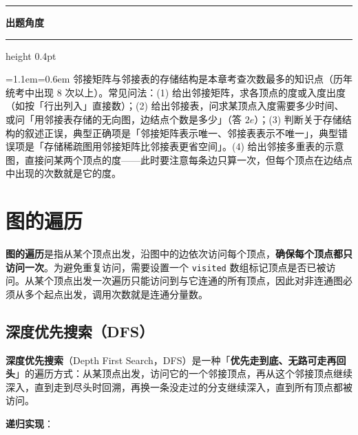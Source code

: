 \documentclass[11pt,openany,UTF8]{ctexbook}
\newcommand{\callouthead}[2]{%
  \par\addvspace{7pt}\noindent
  {\color{#1}\rule[-0.15em]{3pt}{1.05em}}\hspace{0.5em}%
  {\bfseries\color{#1}#2}\par\nobreak\vspace{-0.35em}%
  {\color{rulesep}\hrule height 0.4pt}\nobreak\vspace{0.45em}%
  \begingroup\small\setlength{\parindent}{0pt}%
  \leftskip=1.1em\rightskip=0.6em\noindent\ignorespaces}
\newcommand{\calloutend}{\par\endgroup\addvspace{7pt}}
\newenvironment{callexam}[1]{\callouthead{exambar}{#1}}{\calloutend}
\begin{document}
\begin{callexam}{出题角度}
邻接矩阵与邻接表的存储结构是本章考查次数最多的知识点（历年统考中出现 8 次以上）。常见问法：(1) 给出邻接矩阵，求各顶点的度或入度出度（如按「行出列入」直接数）；(2) 给出邻接表，问求某顶点入度需要多少时间、或问「用邻接表存储的无向图，边结点个数是多少」（答 $2e$）；(3) 判断关于存储结构的叙述正误，典型正确项是「邻接矩阵表示唯一、邻接表表示不唯一」，典型错误项是「存储稀疏图用邻接矩阵比邻接表更省空间」。(4) 给出邻接多重表的示意图，直接问某两个顶点的度——此时要注意每条边只算一次，但每个顶点在边结点中出现的次数就是它的度。

\end{callexam}

\section{图的遍历}

\textbf{图的遍历}是指从某个顶点出发，沿图中的边依次访问每个顶点，\textbf{确保每个顶点都只访问一次}。为避免重复访问，需要设置一个 \texttt{visited} 数组标记顶点是否已被访问。从某个顶点出发一次遍历只能访问到与它连通的所有顶点，因此对非连通图必须从多个起点出发，调用次数就是连通分量数。

\subsection{深度优先搜索（DFS）}

\textbf{深度优先搜索}（Depth First Search，DFS）是一种「\textbf{优先走到底、无路可走再回头}」的遍历方式：从某顶点出发，访问它的一个邻接顶点，再从这个邻接顶点继续深入，直到走到尽头时回溯，再换一条没走过的分支继续深入，直到所有顶点都被访问。

\textbf{递归实现}：

\end{document}
